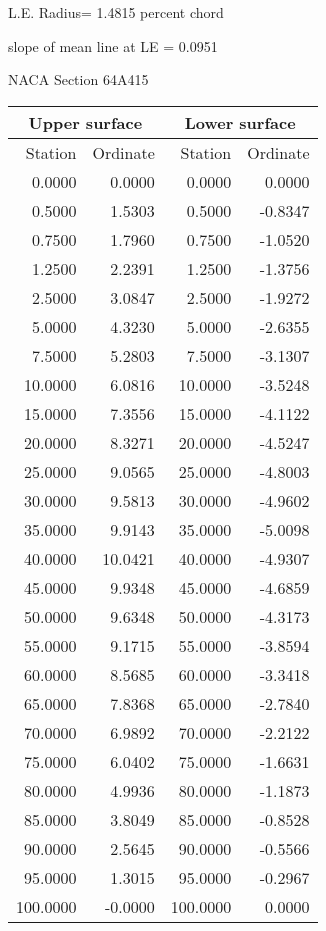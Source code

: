 \documentclass[11pt]{book}
\begin{document}
L.E. Radius=  1.4815 percent chord


 slope of mean line at LE =  0.0951
 \newpage
  \label{s64A415}
 \begin{Large}
 NACA Section 64A415
 \end{Large}
  
 \vspace{8mm}
 \begin{tabular}{|r|r|r|r|} \hline 
 \multicolumn{2}{|c|}{Upper surface} & \multicolumn{2}{|c|}{Lower surface} \\
 \hline
 Station & Ordinate & Station & Ordinate \\
 \hline
0.0000 & 0.0000 & 0.0000 & 0.0000 \\
0.5000 & 1.5303 & 0.5000 & -0.8347 \\
0.7500 & 1.7960 & 0.7500 & -1.0520 \\
1.2500 & 2.2391 & 1.2500 & -1.3756 \\
2.5000 & 3.0847 & 2.5000 & -1.9272 \\
5.0000 & 4.3230 & 5.0000 & -2.6355 \\
7.5000 & 5.2803 & 7.5000 & -3.1307 \\
10.0000 & 6.0816 & 10.0000 & -3.5248 \\
15.0000 & 7.3556 & 15.0000 & -4.1122 \\
20.0000 & 8.3271 & 20.0000 & -4.5247 \\
25.0000 & 9.0565 & 25.0000 & -4.8003 \\
30.0000 & 9.5813 & 30.0000 & -4.9602 \\
35.0000 & 9.9143 & 35.0000 & -5.0098 \\
40.0000 & 10.0421 & 40.0000 & -4.9307 \\
45.0000 & 9.9348 & 45.0000 & -4.6859 \\
50.0000 & 9.6348 & 50.0000 & -4.3173 \\
55.0000 & 9.1715 & 55.0000 & -3.8594 \\
60.0000 & 8.5685 & 60.0000 & -3.3418 \\
65.0000 & 7.8368 & 65.0000 & -2.7840 \\
70.0000 & 6.9892 & 70.0000 & -2.2122 \\
75.0000 & 6.0402 & 75.0000 & -1.6631 \\
80.0000 & 4.9936 & 80.0000 & -1.1873 \\
85.0000 & 3.8049 & 85.0000 & -0.8528 \\
90.0000 & 2.5645 & 90.0000 & -0.5566 \\
95.0000 & 1.3015 & 95.0000 & -0.2967 \\
100.0000 & -0.0000 & 100.0000 & 0.0000 \\
 \hline 
 \end{tabular}
\end{document}
